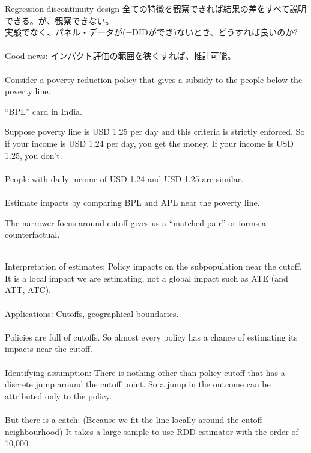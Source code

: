 \begin{frame}{Regression discontinuity design}
全ての特徴を観察できれば結果の差をすべて説明できる。が、観察できない。\\
\pause
実験でなく、パネル・データが(=DIDができ)ないとき、どうすれば良いのか?\\~\\
\pause
Good news: \pause インパクト評価の範囲を狭くすれば、推計可能。
\\~\\

\pause
Consider a poverty reduction policy that gives a subsidy to the people below the poverty line.
\begin{dinglist}{45}
\vspace{1.0ex}\setlength{\itemsep}{1.0ex}\setlength{\baselineskip}{12pt}
\pause
\item	 ``BPL'' card in India.
\end{dinglist}
\pause
\vspace{2.0ex}
Suppose poverty line is USD 1.25 per day and this criteria is strictly enforced. So if your income is USD 1.24 per day, you get the money. If your income is USD 1.25, you don't.\\~\\

\pause
People with daily income of USD 1.24 and USD 1.25 are similar. \\~\\

\pause
Estimate impacts by comparing BPL and APL near the poverty line.
\end{frame}

\begin{frame}{}
The narrower focus around cutoff gives us a ``matched pair'' or forms a counterfactual. \\~\\
\pause

Interpretation of estimates: Policy impacts on the subpopulation near the cutoff. \pause 
It is a local impact we are estimating, not a global impact such as ATE (and ATT, ATC). \\~\\

\pause
Applications: Cutoffs, geographical boundaries.\\~\\

\pause
Policies are full of cutoffs. So almost every policy has a chance of estimating its impacts near the cutoff.\\~\\

\pause
Identifying assumption:
\pause
There is nothing other than policy cutoff that has a discrete jump around the cutoff point. So a jump in the outcome can be attributed only to the policy.\\~\\

\pause
But there is a catch: (Because we fit the line locally around the cutoff neighbourhood) It takes a large sample to use RDD estimator with the order of 10,000. 
\end{frame}

